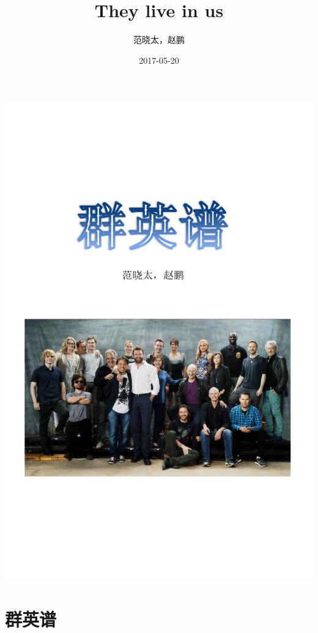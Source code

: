 \documentclass[openany]{ctexbook}
\title{They live in us}
\author{范晓太，赵鹏}
\date{2017-05-20}
\begin{document}
%
\begin{titlepage}
    \centering
    \includegraphics[width=\textwidth]{images/cover.pdf}
\end{titlepage}

\thispagestyle{empty}

\setlength{\abovedisplayskip}{-5pt}
\setlength{\abovedisplayshortskip}{-5pt}

{
\setcounter{tocdepth}{2}
\tableofcontents
}
\mainmatter

\part{群英谱}\label{qyp}
\end{document}
